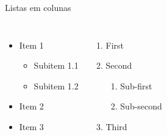 \documentclass[aspectratio=169]{beamer}
\begin{document}
\begin{frame}{Listas em colunas}
    \begin{columns}[t, onlytextwidth]
            \begin{itemize}
                \item Item 1
                \begin{itemize}
                    \item Subitem 1.1
                    \item Subitem 1.2
                \end{itemize}
                \item Item 2
                \item Item 3
            \end{itemize}
        
            \begin{enumerate}
                \item First
                \item Second
                \begin{enumerate}
                    \item Sub-first
                    \item Sub-second
                \end{enumerate}
                \item Third
            \end{enumerate}
    \end{columns}
\end{frame}
\end{document}
